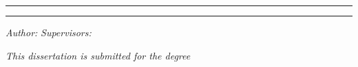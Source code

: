 


\begin{titlepage}
  \thispagestyle{empty}

  \begin{center}
    {\color{BrownRed} \LARGE \textsc{\theUniversity{}}}
    \par \vspace{3mm}
    \par {\color{BrownRed} \Large \textsc{\theInstitute{}}}

    \vspace{20mm}

    \hrule
    \par \vspace{8mm}
    \par {\huge \textbf{\theTitle{}}}
    \par \vspace{8mm}
    \par \hrule

    \vspace{18mm}

    {\Large \textsc{\theThesis{}}}

    \vspace{18mm}

    {\large \textit{Author:} \hfill \textit{Supervisors:}}
    \par {\color{BrownRed} \large \theAuthor{} \hfill \theFirstSupervisor{}}
    \par {\color{BrownRed} \large \hfill \theSecondSupervisor{}}

    \vfill

    {\large \textit{This dissertation is submitted for the degree}}
    \par {\large \textit{\theDegree{}}}

    \vfill

    {\large \theDate{}}
  \end{center}
\end{titlepage}